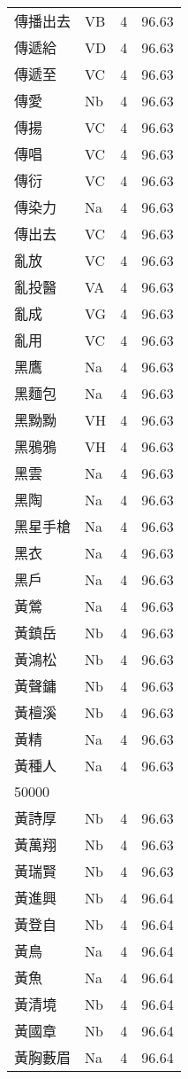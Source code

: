 \documentclass[twocolumn]{book}
\begin{document}
\begin{supertabular}{llrr}
傳播出去 & VB & 4 &  96.63\\
傳遞給 & VD & 4 &  96.63\\
傳遞至 & VC & 4 &  96.63\\
傳愛 & Nb & 4 &  96.63\\
傳揚 & VC & 4 &  96.63\\
傳唱 & VC & 4 &  96.63\\
傳衍 & VC & 4 &  96.63\\
傳染力 & Na & 4 &  96.63\\
傳出去 & VC & 4 &  96.63\\
亂放 & VC & 4 &  96.63\\
亂投醫 & VA & 4 &  96.63\\
亂成 & VG & 4 &  96.63\\
亂用 & VC & 4 &  96.63\\
黑鷹 & Na & 4 &  96.63\\
黑麵包 & Na & 4 &  96.63\\
黑黝黝 & VH & 4 &  96.63\\
黑鴉鴉 & VH & 4 &  96.63\\
黑雲 & Na & 4 &  96.63\\
黑陶 & Na & 4 &  96.63\\
黑星手槍 & Na & 4 &  96.63\\
黑衣 & Na & 4 &  96.63\\
黑戶 & Na & 4 &  96.63\\
黃鶯 & Na & 4 &  96.63\\
黃鎮岳 & Nb & 4 &  96.63\\
黃鴻松 & Nb & 4 &  96.63\\
黃聲鏞 & Nb & 4 &  96.63\\
黃檀溪 & Nb & 4 &  96.63\\
黃精 & Na & 4 &  96.63\\
黃種人 & Na & 4 &  96.63\\
50000\\
黃詩厚 & Nb & 4 &  96.63\\
黃萬翔 & Nb & 4 &  96.63\\
黃瑞賢 & Nb & 4 &  96.63\\
黃進興 & Nb & 4 &  96.64\\
黃登自 & Nb & 4 &  96.64\\
黃鳥 & Na & 4 &  96.64\\
黃魚 & Na & 4 &  96.64\\
黃清境 & Nb & 4 &  96.64\\
黃國章 & Nb & 4 &  96.64\\
黃胸藪眉 & Na & 4 &  96.64\\

\end{supertabular}
\end{document}
